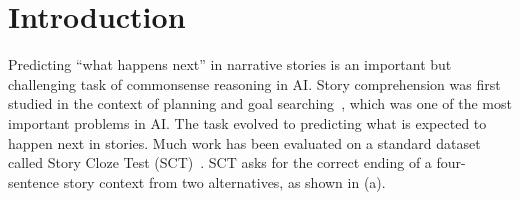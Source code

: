 \section{Introduction}
\label{sec:intro}

Predicting ``what happens next'' in narrative stories is an important
but challenging task of commonsense reasoning in AI. 
Story comprehension was first studied in the context of 
planning and goal searching~\cite{meehan1977tale}, which was one of the
most important problems in AI. The task evolved %
to predicting what is expected to happen next in stories. Much work
has been evaluated on a standard dataset called 
Story Cloze Test (SCT)~\cite{mostafazadeh2016corpus}. 
SCT asks for the correct ending of a four-sentence
story context from two alternatives, as shown in
(a). 




